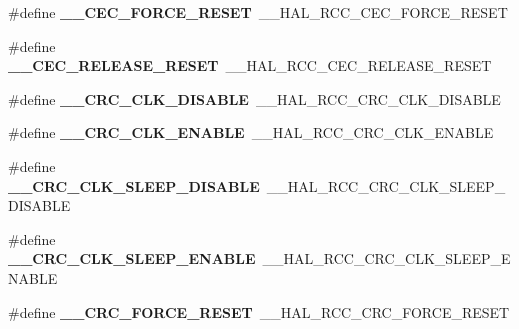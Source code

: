 \begin{DoxyCompactItemize}
\item 
\#define {\bfseries \+\_\+\+\_\+\+C\+E\+C\+\_\+\+F\+O\+R\+C\+E\+\_\+\+R\+E\+S\+ET}~\+\_\+\+\_\+\+H\+A\+L\+\_\+\+R\+C\+C\+\_\+\+C\+E\+C\+\_\+\+F\+O\+R\+C\+E\+\_\+\+R\+E\+S\+ET\hypertarget{group___h_a_l___r_c_c___aliased_gaa0ae35657ca362e06303e65c49af90ca}{}\label{group___h_a_l___r_c_c___aliased_gaa0ae35657ca362e06303e65c49af90ca}

\item 
\#define {\bfseries \+\_\+\+\_\+\+C\+E\+C\+\_\+\+R\+E\+L\+E\+A\+S\+E\+\_\+\+R\+E\+S\+ET}~\+\_\+\+\_\+\+H\+A\+L\+\_\+\+R\+C\+C\+\_\+\+C\+E\+C\+\_\+\+R\+E\+L\+E\+A\+S\+E\+\_\+\+R\+E\+S\+ET\hypertarget{group___h_a_l___r_c_c___aliased_gac2245e2719e46e154ed818c690ed2ec8}{}\label{group___h_a_l___r_c_c___aliased_gac2245e2719e46e154ed818c690ed2ec8}

\item 
\#define {\bfseries \+\_\+\+\_\+\+C\+R\+C\+\_\+\+C\+L\+K\+\_\+\+D\+I\+S\+A\+B\+LE}~\+\_\+\+\_\+\+H\+A\+L\+\_\+\+R\+C\+C\+\_\+\+C\+R\+C\+\_\+\+C\+L\+K\+\_\+\+D\+I\+S\+A\+B\+LE\hypertarget{group___h_a_l___r_c_c___aliased_ga74ee972cc90d4c53df5ee0a143c7d383}{}\label{group___h_a_l___r_c_c___aliased_ga74ee972cc90d4c53df5ee0a143c7d383}

\item 
\#define {\bfseries \+\_\+\+\_\+\+C\+R\+C\+\_\+\+C\+L\+K\+\_\+\+E\+N\+A\+B\+LE}~\+\_\+\+\_\+\+H\+A\+L\+\_\+\+R\+C\+C\+\_\+\+C\+R\+C\+\_\+\+C\+L\+K\+\_\+\+E\+N\+A\+B\+LE\hypertarget{group___h_a_l___r_c_c___aliased_ga212c2a16ed2c43e0123d70cc9c87bfa7}{}\label{group___h_a_l___r_c_c___aliased_ga212c2a16ed2c43e0123d70cc9c87bfa7}

\item 
\#define {\bfseries \+\_\+\+\_\+\+C\+R\+C\+\_\+\+C\+L\+K\+\_\+\+S\+L\+E\+E\+P\+\_\+\+D\+I\+S\+A\+B\+LE}~\+\_\+\+\_\+\+H\+A\+L\+\_\+\+R\+C\+C\+\_\+\+C\+R\+C\+\_\+\+C\+L\+K\+\_\+\+S\+L\+E\+E\+P\+\_\+\+D\+I\+S\+A\+B\+LE\hypertarget{group___h_a_l___r_c_c___aliased_gaada0cd2d2a82866dccf1340de75e3c45}{}\label{group___h_a_l___r_c_c___aliased_gaada0cd2d2a82866dccf1340de75e3c45}

\item 
\#define {\bfseries \+\_\+\+\_\+\+C\+R\+C\+\_\+\+C\+L\+K\+\_\+\+S\+L\+E\+E\+P\+\_\+\+E\+N\+A\+B\+LE}~\+\_\+\+\_\+\+H\+A\+L\+\_\+\+R\+C\+C\+\_\+\+C\+R\+C\+\_\+\+C\+L\+K\+\_\+\+S\+L\+E\+E\+P\+\_\+\+E\+N\+A\+B\+LE\hypertarget{group___h_a_l___r_c_c___aliased_ga8ffcd0f32b2bec3cf768fb881b67848c}{}\label{group___h_a_l___r_c_c___aliased_ga8ffcd0f32b2bec3cf768fb881b67848c}

\item 
\#define {\bfseries \+\_\+\+\_\+\+C\+R\+C\+\_\+\+F\+O\+R\+C\+E\+\_\+\+R\+E\+S\+ET}~\+\_\+\+\_\+\+H\+A\+L\+\_\+\+R\+C\+C\+\_\+\+C\+R\+C\+\_\+\+F\+O\+R\+C\+E\+\_\+\+R\+E\+S\+ET\hypertarget{group___h_a_l___r_c_c___aliased_gac941965d29951a88423ecb539ce31beb}{}\label{group___h_a_l___r_c_c___aliased_gac941965d29951a88423ecb539ce31beb}


\end{DoxyCompactItemize}
